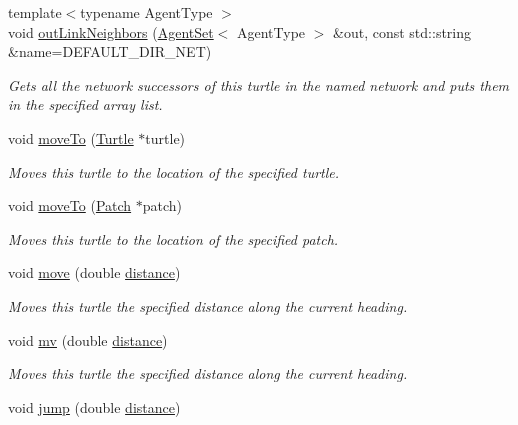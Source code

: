 \begin{DoxyCompactItemize}
{\footnotesize template$<$typename Agent\-Type $>$ }\\void \hyperlink{classrepast_1_1relogo_1_1_turtle_a7bc1dd39af216bf3df38058fc5702514}{out\-Link\-Neighbors} (\hyperlink{classrepast_1_1relogo_1_1_agent_set}{Agent\-Set}$<$ Agent\-Type $>$ \&out, const std\-::string \&name=D\-E\-F\-A\-U\-L\-T\-\_\-\-D\-I\-R\-\_\-\-N\-E\-T)
\begin{DoxyCompactList}\small\item\em Gets all the network successors of this turtle in the named network and puts them in the specified array list. \end{DoxyCompactList}\item 
void \hyperlink{classrepast_1_1relogo_1_1_turtle_a3aa3ddecaeaedc62f2a748ac01042894}{move\-To} (\hyperlink{classrepast_1_1relogo_1_1_turtle}{Turtle} $\ast$turtle)
\begin{DoxyCompactList}\small\item\em Moves this turtle to the location of the specified turtle. \end{DoxyCompactList}\item 
void \hyperlink{classrepast_1_1relogo_1_1_turtle_a93590127823b44b6555c2e1e8897f89b}{move\-To} (\hyperlink{classrepast_1_1relogo_1_1_patch}{Patch} $\ast$patch)
\begin{DoxyCompactList}\small\item\em Moves this turtle to the location of the specified patch. \end{DoxyCompactList}\item 
void \hyperlink{classrepast_1_1relogo_1_1_turtle_a754447665cdbed97b278c479a8c30bbc}{move} (double \hyperlink{classrepast_1_1relogo_1_1_turtle_af1f309528154fa89567e4c4e7b6660b6}{distance})
\begin{DoxyCompactList}\small\item\em Moves this turtle the specified distance along the current heading. \end{DoxyCompactList}\item 
void \hyperlink{classrepast_1_1relogo_1_1_turtle_a1d0f6b4ad1294b7f0bc834bad9b19c7f}{mv} (double \hyperlink{classrepast_1_1relogo_1_1_turtle_af1f309528154fa89567e4c4e7b6660b6}{distance})
\begin{DoxyCompactList}\small\item\em Moves this turtle the specified distance along the current heading. \end{DoxyCompactList}\item 
void \hyperlink{classrepast_1_1relogo_1_1_turtle_ada7cc9cf9315b260525fb8b55b830b84}{jump} (double \hyperlink{classrepast_1_1relogo_1_1_turtle_af1f309528154fa89567e4c4e7b6660b6}{distance})

\end{DoxyCompactItemize}
